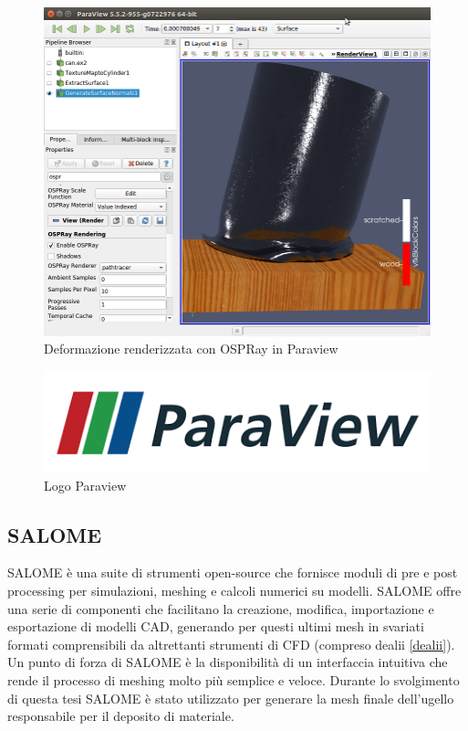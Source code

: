         \begin{figure}[H]
            \centering
            \includegraphics[width=\linewidth]{figure/ospray.png}
            \caption{Deformazione renderizzata con OSPRay in Paraview}
        \end{figure}
        
        \begin{figure}[H]
            \centering
            \includegraphics[width=\linewidth]{figure/paraview.png}
            \caption{Logo Paraview}
        \end{figure}
        
        \subsection{SALOME}\label{salome}
        SALOME è una suite di strumenti open-source che fornisce moduli di pre e post processing per simulazioni, meshing e calcoli numerici su modelli.
        SALOME offre una serie di componenti che facilitano la creazione, modifica, importazione e esportazione di modelli CAD, generando per questi ultimi mesh in svariati formati
        comprensibili da altrettanti strumenti di CFD (compreso dealii \ref{dealii}). Un punto di forza di SALOME è la disponibilità di un interfaccia intuitiva che rende il processo
        di meshing molto più semplice e veloce. Durante lo svolgimento di questa tesi SALOME è stato utilizzato per generare la mesh finale dell'ugello responsabile per il deposito di materiale.

